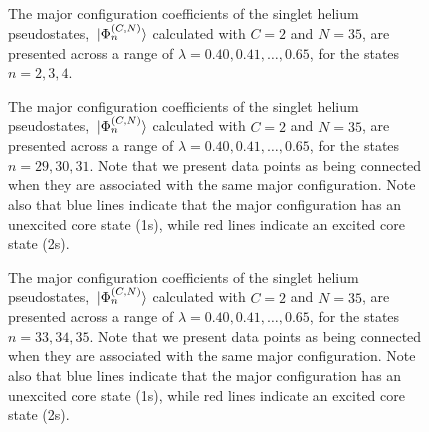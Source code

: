\documentclass[]{article}
\begin{document}
\clearpage


\begin{figure}[h]
  \begin{center}
    
  \end{center}
  \caption[Major Configuration Coefficients: Singly-Excited]{
    The major configuration coefficients of the singlet helium pseudostates,
    $\ket*{\Phi_{n}^{(C, N)}}$ calculated with $C = 2$ and $N = 35$, are
    presented across a range of $\lambda = 0.40, 0.41, \dotsc, 0.65$, for the
    states $n = 2, 3, 4$.
  }
  \label{fig:mcc_3}
\end{figure}

\begin{figure}[h]
  \begin{center}
    
  \end{center}
  \caption[Major Configuration Coefficients: Auto-Ionising I]{
    The major configuration coefficients of the singlet helium pseudostates,
    $\ket*{\Phi_{n}^{(C, N)}}$ calculated with $C = 2$ and $N = 35$, are
    presented across a range of $\lambda = 0.40, 0.41, \dotsc, 0.65$, for the
    states $n = 29, 30, 31$.
    Note that we present data points as being connected when they are associated
    with the same major configuration.
    Note also that blue lines indicate that the major configuration has an
    unexcited core state (1s), while red lines indicate an excited core state
    (2s).
  }
  \label{fig:mcc_30}
\end{figure}

\begin{figure}[h]
  \begin{center}
    
  \end{center}
  \caption[Major Configuration Coefficients: Auto-Ionising II]{
    The major configuration coefficients of the singlet helium pseudostates,
    $\ket*{\Phi_{n}^{(C, N)}}$ calculated with $C = 2$ and $N = 35$, are
    presented across a range of $\lambda = 0.40, 0.41, \dotsc, 0.65$, for the
    states $n = 33, 34, 35$.
    Note that we present data points as being connected when they are associated
    with the same major configuration.
    Note also that blue lines indicate that the major configuration has an
    unexcited core state (1s), while red lines indicate an excited core state
    (2s).
  }
  \label{fig:mcc_34}
\end{figure}
\end{document}
